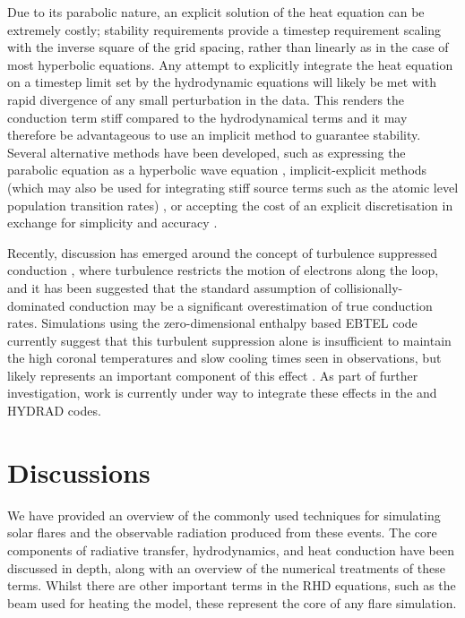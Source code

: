 Due to its parabolic nature, an explicit solution of the heat equation can be extremely costly; stability requirements provide a timestep requirement scaling with the inverse square of the grid spacing, rather than linearly as in the case of most hyperbolic equations.
Any attempt to explicitly integrate the heat equation on a timestep limit set by the hydrodynamic equations will likely be met with rapid divergence of any small perturbation in the data.
This renders the conduction term stiff compared to the hydrodynamical terms and it may therefore be advantageous to use an implicit method  to guarantee stability.
Several alternative methods have been developed, such as expressing the parabolic equation as a hyperbolic wave equation \citep{Rempel2016}, implicit-explicit methods (which may also be used for integrating stiff source terms such as the atomic level population transition rates) \citep[e.g.][]{Ascher1995}, or accepting the cost of an explicit discretisation in exchange for simplicity and accuracy \citep{Bradshaw2003, Bradshaw2013}.

Recently, discussion has emerged around the concept of turbulence suppressed conduction \citep{Bian2016}, where turbulence restricts the motion of electrons along the loop, and it has been suggested that the standard assumption of collisionally-dominated conduction may be a significant overestimation of true conduction rates.
Simulations using the zero-dimensional enthalpy based EBTEL code \NeedRef{} currently suggest that this turbulent suppression alone is insufficient to maintain the high coronal temperatures and slow cooling times seen in observations, but likely represents an important component of this effect \citep{Bian2018}.
As part of further investigation, work is currently under way to integrate these effects in the \Radyn{} and HYDRAD codes.

\section{Discussions}

We have provided an overview of the commonly used techniques for simulating solar flares and the observable radiation produced from these events.
The core components of radiative transfer, hydrodynamics, and heat conduction have been discussed in depth, along with an overview of the numerical treatments of these terms.
Whilst there are other important terms in the RHD equations, such as the beam used for heating the model, these represent the core of any flare simulation.

